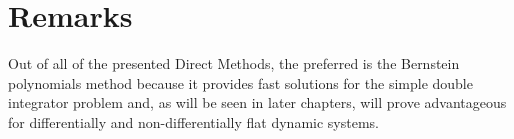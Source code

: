\section{Remarks}

\par Out of all of the presented Direct Methods, the preferred is the Bernstein polynomials method because it provides fast solutions for the simple double integrator problem and, as will be seen in later chapters, will prove advantageous for differentially and non-differentially flat dynamic systems.
